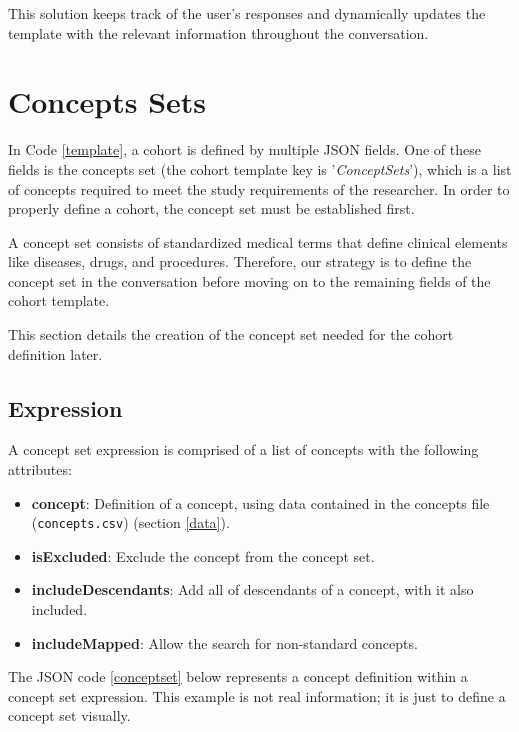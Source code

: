 This solution keeps track of the user's responses and dynamically updates the template with the relevant information throughout the conversation.


\section{Concepts Sets}


In Code \ref{template}, a cohort is defined by multiple JSON fields. One of these fields is the concepts set (the cohort template key is '\textit{ConceptSets}'), which is a list of concepts required to meet the study requirements of the researcher. In order to properly define a cohort, the concept set must be established first. 

A concept set consists of standardized medical terms that define clinical elements like diseases, drugs, and procedures. Therefore, our strategy is to define the concept set in the conversation before moving on to the remaining fields of the cohort template.

This section details the creation of the concept set needed for the cohort definition later.


\subsection{Expression}
A concept set expression is comprised of a list of concepts with the following attributes:

\begin{itemize}
  \item \textbf{concept}: Definition of a concept, using data contained in the concepts file  {\small\normalfont(\texttt{concepts.csv})} (section \ref{data}).
  \item \textbf{isExcluded}: Exclude the concept from the concept set.
  \item \textbf{includeDescendants}: Add all of descendants of a concept, with it also included.
  \item \textbf{includeMapped}: Allow the search for non-standard concepts.
\end{itemize}


The JSON code \ref{conceptset} below represents a concept definition within a concept set expression. This example is not real information; it is just to define a concept set visually.

